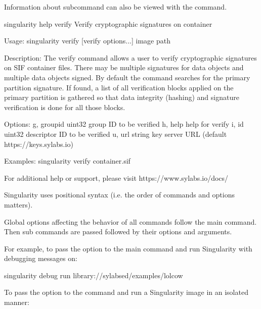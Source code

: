 \documentclass[letterpaper,10pt,english]{sphinxmanual}
\begin{document}
Information about subcommand can also be viewed with the  command.

%
\begin{sphinxVerbatim}[commandchars=\\\{\}]
\PYGZdl{} singularity help verify
Verify cryptographic signatures on container

Usage:
  singularity verify [verify options...] \PYGZlt{}image path\PYGZgt{}

Description:
  The verify command allows a user to verify cryptographic signatures on SIF
  container files. There may be multiple signatures for data objects and
  multiple data objects signed. By default the command searches for the primary
  partition signature. If found, a list of all verification blocks applied on
  the primary partition is gathered so that data integrity (hashing) and
  signature verification is done for all those blocks.

Options:
  \PYGZhy{}g, \PYGZhy{}\PYGZhy{}groupid uint32   group ID to be verified
  \PYGZhy{}h, \PYGZhy{}\PYGZhy{}help             help for verify
  \PYGZhy{}i, \PYGZhy{}\PYGZhy{}id uint32        descriptor ID to be verified
  \PYGZhy{}u, \PYGZhy{}\PYGZhy{}url string       key server URL (default \PYGZdq{}https://keys.sylabs.io\PYGZdq{})


Examples:
  \PYGZdl{} singularity verify container.sif


For additional help or support, please visit https://www.sylabs.io/docs/
\end{sphinxVerbatim}

Singularity uses positional syntax (i.e. the order of commands and options
matters).

Global options affecting the behavior of all commands follow the main
 command. Then sub commands are passed followed by their options
and arguments.

For example, to pass the  option to the main  command
and run Singularity with debugging messages on:

%
\begin{sphinxVerbatim}[commandchars=\\\{\}]
\PYGZdl{} singularity \PYGZhy{}\PYGZhy{}debug run library://sylabsed/examples/lolcow
\end{sphinxVerbatim}

To pass the  option to the  command and run a
Singularity image in an isolated manner:
\end{document}
